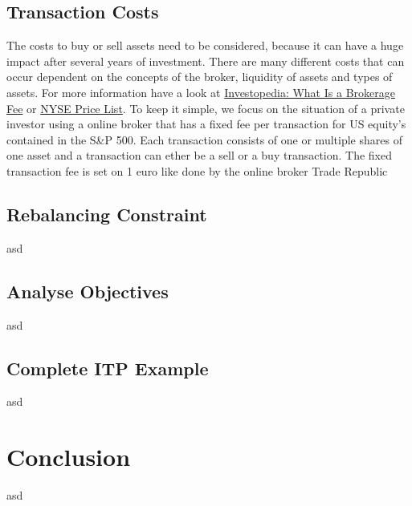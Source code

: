\documentclass[
  oneside]{book}
\begin{document}
\hypertarget{transaction-costs}{%
\section{Transaction Costs}\label{transaction-costs}}

The costs to buy or sell assets need to be considered, because it can have a huge impact after several years of investment. There are many different costs that can occur dependent on the concepts of the broker, liquidity of assets and types of assets. For more information have a look at \href{https://www.investopedia.com/terms/b/brokerage-fee.asp\#:~:text=Realtors\%20and\%20real\%20estate\%20brokers,offer\%20a\%20fixed\%2Dfee\%20service.}{Investopedia: What Is a Brokerage Fee} or \href{https://www.nyse.com/publicdocs/nyse/markets/nyse/NYSE_Price_List.pdf}{NYSE Price List}. To keep it simple, we focus on the situation of a private investor using a online broker that has a fixed fee per transaction for US equity's contained in the S\&P 500. Each transaction consists of one or multiple shares of one asset and a transaction can ether be a sell or a buy transaction. The fixed transaction fee is set on 1 euro like done by the online broker Trade Republic

\hypertarget{rebalancing-constraint}{%
\section{Rebalancing Constraint}\label{rebalancing-constraint}}

asd

\hypertarget{analyse-objectives}{%
\section{Analyse Objectives}\label{analyse-objectives}}

asd

\hypertarget{complete-itp-example}{%
\section{Complete ITP Example}\label{complete-itp-example}}

asd

\hypertarget{conclusion}{%
\chapter{Conclusion}\label{conclusion}}

asd

  
\end{document}
